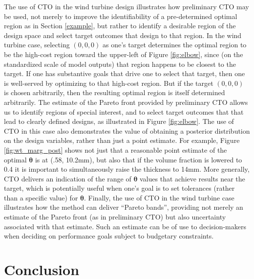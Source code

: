 \documentclass[12pt]{article}
\begin{document}
The use of CTO in the wind turbine design illustrates how preliminary CTO may be used, not merely to improve the identifiability of a pre-determined optimal region as in Section \ref{example}, but rather to identify a desirable region of the design space and select target outcomes that design to that region.
%
In the wind turbine case, selecting $(0,0,0)$ as one's target determines the optimal region to be the high-cost region toward the upper-left of Figure \ref{fig:elbow}, since (on the standardized scale of model outputs) that region happens to be closest to the target.
%
If one has substantive goals that drive one to select that target, then one is well-served by optimizing to that high-cost region.
%
But if the target $(0,0,0)$ is chosen arbitrarily, then the resulting optimal region is itself determined arbitrarily.
%
The estimate of the Pareto front provided by preliminary CTO allows us to identify regions of special interest, and to select target outcomes that that lead to clearly defined designs, as illustrated in Figure \ref{fig:elbow}.
%
The use of CTO in this case also demonstrates the value of obtaining a posterior distribution on the design variables, rather than just a point estimate.
%
For example, Figure \ref{fig:wt_marg_post} shows not just that a reasonable point estimate of the optimal $\boldsymbol\theta$ is at (.58, 10.2mm), but also that if the volume fraction is lowered to 0.4 it is important to simultaneously raise the thickness to 14mm.
%
More generally, CTO delivers an indication of the range of $\boldsymbol\theta$ values that achieve results near the target, which is potentially useful when one's goal is to set tolerances (rather than a specific value) for $\boldsymbol\theta$.
%
Finally, the use of CTO in the wind turbine case illustrates how the method can deliver ``Pareto bands'', providing not merely an estimate of the Pareto front (as in preliminary CTO) but also uncertainty associated with that estimate.
%
Such an estimate can be of use to decision-makers when deciding on performance goals subject to budgetary constraints.



\section{Conclusion} \label{conclusion}
\end{document}
